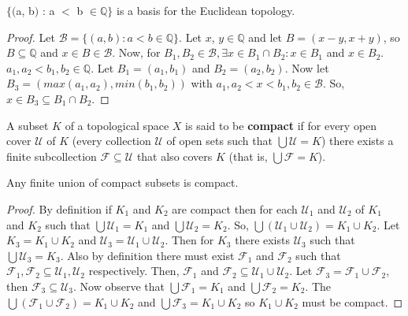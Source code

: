 \documentclass{article}
\begin{document}
	\begin{theorem}
	$\lbrace($a, b$)$ : a $<$ b $\in \mathbb{Q}\rbrace$ is a basis for the Euclidean topology.
	\end{theorem}
	\begin{proof}
	Let $\mathcal{B} = \lbrace (a, b) : a<b \in \mathbb{Q}\rbrace$. Let $x$, $y \in \mathbb{Q}$ and let $B = (x-y, x+y)$, so $B \subseteq \mathbb{Q}$ and $x \in B \in \mathcal{B}$. Now, for $B_1, B_2 \in \mathcal{B}, \exists x \in B_1 \cap B_2 : x \in B_1$ and $x \in B_2$. $a_1, a_2 < b_1, b_2 \in \mathbb{Q}.$ Let $B_1 = (a_1, b_1)$ and $B_2 = (a_2, b_2)$. Now let $B_3 = (max(a_1,a_2), min(b_1,b_2))$ with $a_1,a_2<x<b_1,b_2 \in \mathcal{B}$. So, $x \in B_3 \subseteq B_1 \cap B_2$.
	\end{proof}

	\begin{definition}
	  A subset \(K\) of a topological space \(X\) is said to be \textbf{compact} if for every
	  open cover \(\mathcal U\) of \(K\) (every collection \(\mathcal U\) of open sets
	  such that \(\bigcup \mathcal U=K\)) there exists a finite subcollection
	  \(\mathcal F\subseteq \mathcal U\) that also covers \(K\) (that is,
	  \(\bigcup\mathcal F=K\)).
	\end{definition}

	\begin{theorem}
	  Any finite union of compact subsets is compact.
	\end{theorem}
	
	\begin{proof}
	By definition if $K_1$ and $K_2$ are compact then for each $\mathcal{U}_1$ and $\mathcal{U}_2$ of $K_1$ and $K_2$ such that $\bigcup \mathcal{U}_1 = K_1$ and $\bigcup \mathcal{U}_2 = K_2$. So, $\bigcup (\mathcal{U}_1 \cup \mathcal{U}_2) = K_1 \cup K_2$. Let $K_3 = K_1 \cup K_2$ and $\mathcal{U}_3 = \mathcal{U}_1 \cup \mathcal{U}_2$. Then for $K_3$ there exists $\mathcal{U}_3$ such that $\bigcup \mathcal{U}_3 = K_3$. \newline Also by definition there must exist $\mathcal{F}_1$ and $\mathcal{F}_2$ such that $\mathcal{F}_1, \mathcal{F}_2 \subseteq \mathcal{U}_1, \mathcal{U}_2$ respectively. Then, $\mathcal{F}_1$ and $\mathcal{F}_2 \subseteq \mathcal{U}_1 \cup \mathcal{U}_2$. Let $\mathcal{F}_3 = \mathcal{F}_1 \cup \mathcal{F}_2$, then $\mathcal{F}_3 \subseteq \mathcal{U}_3$. Now observe that $\bigcup \mathcal{F}_1 = K_1$ and $\bigcup \mathcal{F}_2 = K_2$. The $\bigcup (\mathcal{F}_1 \cup \mathcal{F}_2 ) = K_1 \cup K_2$ and $\bigcup \mathcal{F}_3 = K_1 \cup K_2$ so $K_1 \cup K_2$ must be compact.
	\end{proof}
\end{document}
